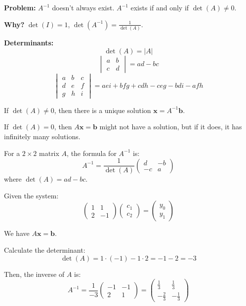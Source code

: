 \documentclass{article}
\begin{document}
\textbf{Problem:} \( A^{-1} \) doesn't always exist. \( A^{-1} \) exists if and only if \( \det(A) \neq 0 \).

\textbf{Why?} \( \det(I) = 1 \), \( \det(A^{-1}) = \frac{1}{\det(A)} \).

\textbf{Determinants:}
\[
\det(A) = |A|
\]
\[
\begin{vmatrix}
a & b \\
c & d
\end{vmatrix}
= ad - bc
\]
\[
\begin{vmatrix}
a & b & c \\
d & e & f \\
g & h & i
\end{vmatrix}
= aei + bfg + cdh - ceg - bdi - afh
\]

If \( \det(A) \neq 0 \), then there is a unique solution \( \mathbf{x} = A^{-1} \mathbf{b} \).

If \( \det(A) = 0 \), then \( A\mathbf{x} = \mathbf{b} \) might not have a solution, but if it does, it has infinitely many solutions.

For a \( 2 \times 2 \) matrix \( A \), the formula for \( A^{-1} \) is:
\[
A^{-1} = \frac{1}{\det(A)} \begin{pmatrix}
d & -b \\
-c & a
\end{pmatrix}
\]
where \( \det(A) = ad - bc \).

Given the system:
\[
\begin{pmatrix}
1 & 1 \\
2 & -1
\end{pmatrix}
\begin{pmatrix}
c_1 \\
c_2
\end{pmatrix}
=
\begin{pmatrix}
y_0 \\
y_1
\end{pmatrix}
\]

We have \( A\mathbf{x} = \mathbf{b} \).

Calculate the determinant:
\[
\det(A) = 1 \cdot (-1) - 1 \cdot 2 = -1 - 2 = -3
\]

Then, the inverse of \( A \) is:
\[
A^{-1} = \frac{1}{-3} \begin{pmatrix}
-1 & -1 \\
2 & 1
\end{pmatrix}
= \begin{pmatrix}
\frac{1}{3} & \frac{1}{3} \\
-\frac{2}{3} & -\frac{1}{3}
\end{pmatrix}
\]
\end{document}
